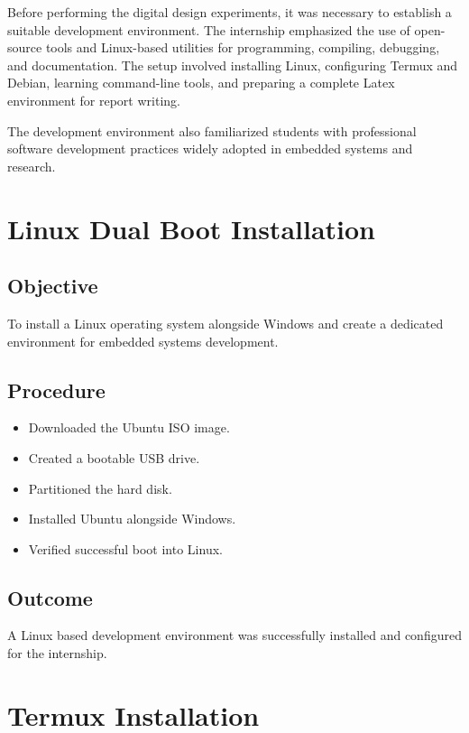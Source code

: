 \documentclass[12pt,a4paper]{report}
\begin{document}
Before performing the digital design experiments, it was necessary to establish a suitable development environment. The internship emphasized the use of open-source tools and Linux-based utilities for programming, compiling, debugging, and documentation. The setup involved installing Linux, configuring Termux and Debian, learning command-line tools, and preparing a complete Latex environment for report writing.

The development environment also familiarized students with professional software development practices widely adopted in embedded systems and research.


\section{Linux Dual Boot Installation}

\subsection{Objective}

To install a Linux operating system alongside Windows and create a dedicated environment for embedded systems development.

\subsection{Procedure}

\begin{itemize}
\item Downloaded the Ubuntu ISO image.
\item Created a bootable USB drive.
\item Partitioned the hard disk.
\item Installed Ubuntu alongside Windows.
\item Verified successful boot into Linux.
\end{itemize}

\subsection{Outcome}

A Linux based development environment was successfully installed and configured for the internship.


\section{Termux Installation}
\end{document}
